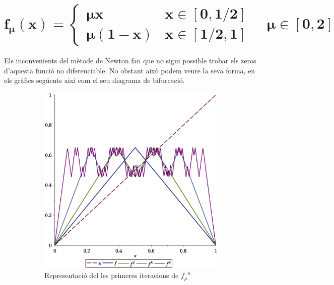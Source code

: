 \documentclass[a4paper]{article}
\theoremstyle{definition}
\begin{document}
\section{\texorpdfstring{$\boldsymbol{f_\mu(x)=\begin{cases}
          \mu x    & x\in[0,1/2] \\
          \mu(1-x) & x\in[1/2,1]
        \end{cases}\quad \mu\in[0,2]}$}{f5}}
Els inconvenients del mètode de Newton fan que no sigui possible trobar els zeros d'aquesta funció no diferenciable. No obstant això podem veure la seva forma, en els gràfics següents així com el seu diagrama de bifurcació.
\begin{figure}[ht]
  \begin{subfigure}[ht]{0.45\linewidth}
    \centering
    \includegraphics[width=\linewidth]{Images/map52.eps}
    \caption{Representació del les primeres iteracions de ${f_\mu }^n$}
  \end{subfigure}
  \hfill
  \begin{subfigure}[ht]{0.45\linewidth}
    \centering

\end{subfigure}
\end{figure}
\end{document}
